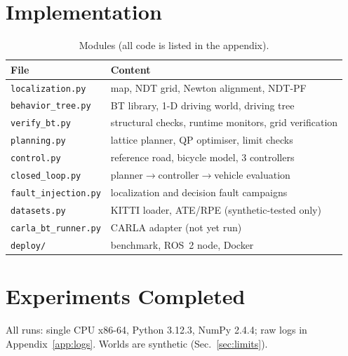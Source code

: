 \documentclass[conference]{IEEEtran}
\begin{document}
\section{Implementation}
\begin{table}[t]\centering\caption{Modules (all code is listed in the appendix).}\small
\begin{tabular}{@{}p{3.3cm}p{4.6cm}@{}}\toprule File & Content\\\midrule
\texttt{localization.py} & map, NDT grid, Newton alignment, NDT-PF\\
\texttt{behavior\_tree.py} & BT library, 1-D driving world, driving tree\\
\texttt{verify\_bt.py} & structural checks, runtime monitors, grid verification\\
\texttt{planning.py} & lattice planner, QP optimiser, limit checks\\
\texttt{control.py} & reference road, bicycle model, 3 controllers\\
\texttt{closed\_loop.py} & planner$\to$controller$\to$vehicle evaluation\\
\texttt{fault\_injection.py} & localization and decision fault campaigns\\
\texttt{datasets.py} & KITTI loader, ATE/RPE (synthetic-tested only)\\
\texttt{carla\_bt\_runner.py} & CARLA adapter (not yet run)\\
\texttt{deploy/} & benchmark, ROS~2 node, Docker\\
\bottomrule\end{tabular}\end{table}

\section{Experiments Completed}
All runs: single CPU x86-64, Python 3.12.3, NumPy 2.4.4; raw logs in Appendix~\ref{app:logs}. Worlds are synthetic (Sec.~\ref{sec:limits}).
\end{document}
